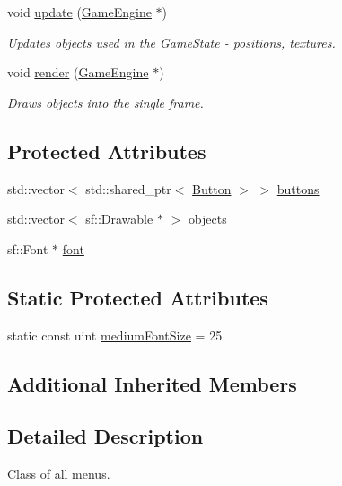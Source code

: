 \begin{DoxyCompactItemize}
void \mbox{\hyperlink{class_base_menu_state_abfc8c5d2c7c3811443fc79a107a5936e}{update}} (\mbox{\hyperlink{class_game_engine}{Game\+Engine}} $\ast$)
\begin{DoxyCompactList}\small\item\em Updates objects used in the \mbox{\hyperlink{class_game_state}{Game\+State}} -\/ positions, textures. \end{DoxyCompactList}\item 
void \mbox{\hyperlink{class_base_menu_state_a404076aa3e789fa75ba1bfe7752c1e18}{render}} (\mbox{\hyperlink{class_game_engine}{Game\+Engine}} $\ast$)
\begin{DoxyCompactList}\small\item\em Draws objects into the single frame. \end{DoxyCompactList}\end{DoxyCompactItemize}
\subsection*{Protected Attributes}
\begin{DoxyCompactItemize}
\item 
std\+::vector$<$ std\+::shared\+\_\+ptr$<$ \mbox{\hyperlink{class_button}{Button}} $>$ $>$ \mbox{\hyperlink{class_base_menu_state_ab63cc442453d06b70372d627ceaf8a8e}{buttons}}
\item 
std\+::vector$<$ sf\+::\+Drawable $\ast$ $>$ \mbox{\hyperlink{class_base_menu_state_ada76393153459237e15591fb244ab5ff}{objects}}
\item 
sf\+::\+Font $\ast$ \mbox{\hyperlink{class_base_menu_state_a2759c3ca4cfd0f34175846e295e0f4e9}{font}}
\end{DoxyCompactItemize}
\subsection*{Static Protected Attributes}
\begin{DoxyCompactItemize}
\item 
static const uint \mbox{\hyperlink{class_base_menu_state_a003cf33aa9c69fa85db7486f6812b4f6}{medium\+Font\+Size}} = 25
\end{DoxyCompactItemize}
\subsection*{Additional Inherited Members}


\subsection{Detailed Description}
Class of all menus. 

